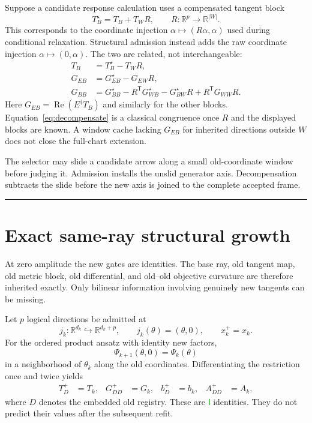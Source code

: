 \documentclass[10pt,twocolumn]{article}
\theoremstyle{definition}
\theoremstyle{remark}
\newcommand{\conceptbreak}{\par\vspace{0.45em}\noindent\textcolor{navy!55}{\rule{\columnwidth}{0.35pt}}\vspace{0.35em}\par}
\newcommand{\R}{\mathbb R}
\newcommand{\Rea}{\operatorname{Re}}
\newcommand{\status}[2]{\textcolor{#1}{\ensuremath{\boxed{\mathsf{#2}}}}}
\begin{document}
Suppose a candidate response calculation uses a compensated tangent block
\begin{equation}
 T_B^\star=T_B+T_WR,\qquad R:\R^p\to\R^{|W|}.
 \label{eq:compensated}
\end{equation}
This corresponds to the coordinate injection $\alpha\mapsto(R\alpha,\alpha)$ used during conditional relaxation.  Structural admission instead adds the raw coordinate injection $\alpha\mapsto(0,\alpha)$.  The two are related, not interchangeable:
\begin{align}
 T_B&=T_B^\star-T_WR,\nonumber\\
 G_{EB}&=G_{EB}^\star-G_{EW}R,\nonumber\\
 G_{BB}&=G_{BB}^\star-R^{\mathsf T}G_{WB}^\star
 -G_{BW}^\star R+R^{\mathsf T}G_{WW}R.
 \label{eq:decompensate}
\end{align}
Here $G_{EB}=\Rea(E^\dagger T_B)$ and similarly for the other blocks.  Equation~\eqref{eq:decompensate} is a classical congruence once $R$ and the displayed blocks are known.  A window cache lacking $G_{EB}$ for inherited directions outside $W$ does not close the full-chart extension.

\begin{geombox}
The selector may slide a candidate arrow along a small old-coordinate window before judging it.  Admission installs the unslid generator axis.  Decompensation subtracts the slide before the new axis is joined to the complete accepted frame.
\end{geombox}

\conceptbreak

\section{Exact same-ray structural growth}
\label{sec:growth}

\begin{microbox}
At zero amplitude the new gates are identities.  The base ray, old tangent map, old metric block, old differential, and old--old objective curvature are therefore inherited exactly.  Only bilinear information involving genuinely new tangents can be missing.
\end{microbox}

Let $p$ logical directions be admitted at
\begin{equation}
 j_k:\R^{d_k}\hookrightarrow\R^{d_k+p},\qquad
 j_k(\theta)=(\theta,0),\qquad x_k^+=x_k.
 \label{eq:registryembedding}
\end{equation}
For the ordered product ansatz with identity new factors,
\begin{equation}
 \Psi_{k+1}(\theta,0)=\Psi_k(\theta)
 \label{eq:restrictionidentity}
\end{equation}
in a neighborhood of $\theta_k$ along the old coordinates.  Differentiating the restriction once and twice yields
\begin{align}
 T_D^+&=T_k,&G_{DD}^+&=G_k,&b_D^+&=b_k,&A_{DD}^+&=A_k,
 \label{eq:oldinherit}
\end{align}
where $D$ denotes the embedded old registry.  These are \status{green}{I} identities.  They do not predict their values after the subsequent refit.
\end{document}
